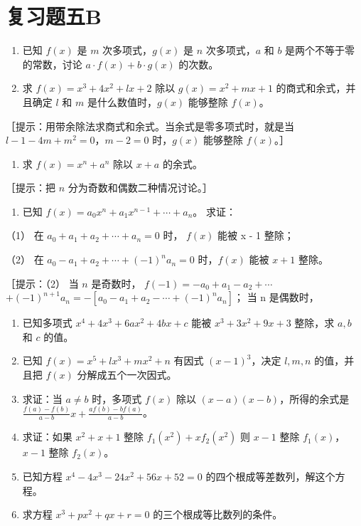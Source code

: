 \section{复习题五B}

\begin{enumerate}
\item
  已知 \(f(x)\) 是 \(m\) 次多项式，\(g(x)\) 是 \(n\) 次多项式，\(a\) 和
  \(b\) 是两个不等于零的常数，讨论 \(a \cdot f(x) + b \cdot g(x)\)
  的次数。
\item
  求 \(f(x) = x^3 + 4x^2 + lx + 2\) 除以 \(g(x) = x^2 + mx + 1\)
  的商式和余式，并且确定 \(l\) 和 \(m\) 是什么数值时，\(g(x)\) 能够整除
  \(f(x)\)。
\end{enumerate}

［提示：用带余除法求商式和余式。当余式是零多项式时，就是当
\(l - 1 - 4m + m^2 = 0\)，\(m - 2 = 0\) 时，\(g(x)\) 能够整除
\(f(x)\)。］

\begin{enumerate}[start=3]
\item
  求 \(f(x) = x^n + a^n\) 除以 \(x + a\) 的余式。
\end{enumerate}

［提示：把 \(n\) 分为奇数和偶数二种情况讨论。］

\begin{enumerate}[start=4]
\item
  已知 \(f(x) = a_0 x^n + a_1 x^{n-1} + \cdots + a_n\)。 求证：
\end{enumerate}

（1） 在 \(a_{0} + a_{1} + a_{2} + \cdots + a_{n} = 0\) 时， \(f(x)\)
能被 x - 1 整除；

（2） 在 \(a_0 - a_1 + a_2 + \cdots + (-1)^n a_n = 0\) 时，\(f(x)\) 能被
\(x + 1\) 整除。

［提示：（2） 当 \(n\) 是奇数时，
\(f(-1) = -a_0 + a_1 - a_2 + \cdots\)\(+(-1)^{n+1}a_{n}=-\left[a_{0}-a_{1}+a_{2}-\cdots+(-1)^{n}a_{n}\right]\)；
当 n 是偶数时，

\begin{enumerate}[start=5]
\item
  已知多项式 \(x^{4} + 4x^{3} + 6ax^{2} + 4bx + c\) 能被
  \(x^{3} + 3x^{2} + 9x + 3\) 整除，求 \(a, b\) 和 \(c\) 的值。
\item
  已知 \(f(x) = x^5 + lx^3 + mx^2 + n\) 有因式 \((x - 1)^3\)，决定
  \(l, m, n\) 的值，并且把 \(f(x)\) 分解成五个一次因式。
\item
  求证：当 \(a \neq b\) 时，多项式 \(f(x)\) 除以
  \((x - a)(x - b)\)，所得的余式是
  \(\frac{f(a) - f(b)}{a - b} x + \frac{af(b) - bf(a)}{a - b}\)。
\item
  求证：如果 \(x^{2} + x + 1\) 整除 \(f_{1}(x^{2}) + xf_{2}(x^{2})\) 则
  \(x - 1\) 整除 \(f_{1}(x)\)，\(x - 1\) 整除 \(f_{2}(x)\)。
\item
  已知方程 \(x^{4} - 4x^{3} - 24x^{2} + 56x + 52 = 0\)
  的四个根成等差数列，解这个方程。
\item
  求方程 \(x^{3} + px^{2} + qx + r = 0\) 的三个根成等比数列的条件。
\end{enumerate}

